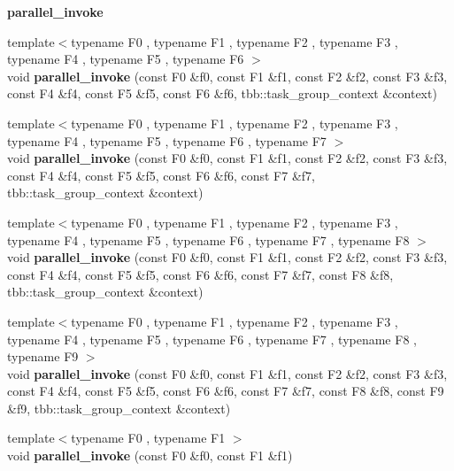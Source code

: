 \begin{Indent}{\bf parallel\+\_\+invoke}
\begin{DoxyCompactItemize}
\item 
\hypertarget{group__algorithms_gad8c1220bbd59e3b8e7bbcdcfdda8047e}{}{\footnotesize template$<$typename F0 , typename F1 , typename F2 , typename F3 , typename F4 , typename F5 , typename F6 $>$ }\\void {\bfseries parallel\+\_\+invoke} (const F0 \&f0, const F1 \&f1, const F2 \&f2, const F3 \&f3, const F4 \&f4, const F5 \&f5, const F6 \&f6, tbb\+::task\+\_\+group\+\_\+context \&context)\label{group__algorithms_gad8c1220bbd59e3b8e7bbcdcfdda8047e}

\item 
\hypertarget{group__algorithms_ga5ee83a66397ee0b15c77756cb5e5168e}{}{\footnotesize template$<$typename F0 , typename F1 , typename F2 , typename F3 , typename F4 , typename F5 , typename F6 , typename F7 $>$ }\\void {\bfseries parallel\+\_\+invoke} (const F0 \&f0, const F1 \&f1, const F2 \&f2, const F3 \&f3, const F4 \&f4, const F5 \&f5, const F6 \&f6, const F7 \&f7, tbb\+::task\+\_\+group\+\_\+context \&context)\label{group__algorithms_ga5ee83a66397ee0b15c77756cb5e5168e}

\item 
\hypertarget{group__algorithms_ga1af92ebd06f6cdf5ee668b1fe62657bd}{}{\footnotesize template$<$typename F0 , typename F1 , typename F2 , typename F3 , typename F4 , typename F5 , typename F6 , typename F7 , typename F8 $>$ }\\void {\bfseries parallel\+\_\+invoke} (const F0 \&f0, const F1 \&f1, const F2 \&f2, const F3 \&f3, const F4 \&f4, const F5 \&f5, const F6 \&f6, const F7 \&f7, const F8 \&f8, tbb\+::task\+\_\+group\+\_\+context \&context)\label{group__algorithms_ga1af92ebd06f6cdf5ee668b1fe62657bd}

\item 
\hypertarget{group__algorithms_ga65846bc3b2f63ed1448b6cdfea9e1c80}{}{\footnotesize template$<$typename F0 , typename F1 , typename F2 , typename F3 , typename F4 , typename F5 , typename F6 , typename F7 , typename F8 , typename F9 $>$ }\\void {\bfseries parallel\+\_\+invoke} (const F0 \&f0, const F1 \&f1, const F2 \&f2, const F3 \&f3, const F4 \&f4, const F5 \&f5, const F6 \&f6, const F7 \&f7, const F8 \&f8, const F9 \&f9, tbb\+::task\+\_\+group\+\_\+context \&context)\label{group__algorithms_ga65846bc3b2f63ed1448b6cdfea9e1c80}

\item 
\hypertarget{group__algorithms_ga6b1c36ece1d3950677dd01ef0863648c}{}{\footnotesize template$<$typename F0 , typename F1 $>$ }\\void {\bfseries parallel\+\_\+invoke} (const F0 \&f0, const F1 \&f1)\label{group__algorithms_ga6b1c36ece1d3950677dd01ef0863648c}


\end{DoxyCompactItemize}
\end{Indent}
